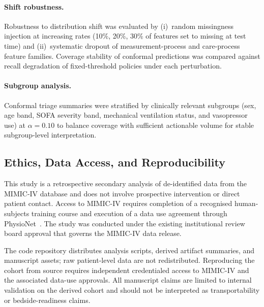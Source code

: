 \documentclass[11pt]{article}
\begin{document}
\paragraph{Shift robustness.}
Robustness to distribution shift was evaluated by (i)~random missingness
injection at increasing rates (10\%, 20\%, 30\% of features set to missing at
test time) and (ii)~systematic dropout of measurement-process and care-process
feature families.  Coverage stability of conformal predictions was compared
against recall degradation of fixed-threshold policies under each perturbation.

\paragraph{Subgroup analysis.}
Conformal triage summaries were stratified by clinically relevant subgroups
(sex, age band, SOFA severity band, mechanical ventilation status, and vasopressor use) at $\alpha = 0.10$ to balance
coverage with sufficient actionable volume for stable subgroup-level
interpretation.

\subsection{Ethics, Data Access, and Reproducibility}\label{sec:ethics}

This study is a retrospective secondary analysis of de-identified data from the
MIMIC-IV database and does not involve prospective intervention or direct patient
contact.  Access to MIMIC-IV requires completion of a recognised human-subjects
training course and execution of a data use agreement through
PhysioNet~\citep{Goldberger2000}.  The study was conducted under the existing
institutional review board approval that governs the MIMIC-IV data release.

The code repository distributes analysis scripts, derived artifact summaries,
and manuscript assets; raw patient-level data are not redistributed.
Reproducing the cohort from source requires independent credentialed access to
MIMIC-IV and the associated data-use approvals.  All manuscript claims are
limited to internal validation on the derived cohort and should not be
interpreted as transportability or bedside-readiness claims.








\end{document}

